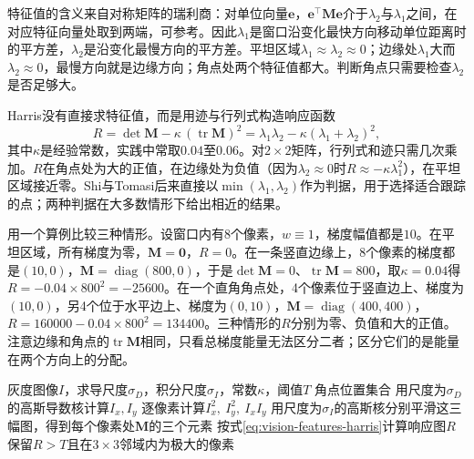 特征值的含义来自对称矩阵的瑞利商：对单位向量$\bm e$，$\bm e^{\top}\bm M\bm e$介于$\lambda_2$与$\lambda_1$之间，在对应特征向量处取到两端，可参考。因此$\lambda_1$是窗口沿变化最快方向移动单位距离时的平方差，$\lambda_2$是沿变化最慢方向的平方差。平坦区域$\lambda_1\approx\lambda_2\approx0$；边缘处$\lambda_1$大而$\lambda_2\approx0$，最慢方向就是边缘方向；角点处两个特征值都大。判断角点只需要检查$\lambda_2$是否足够大。

Harris没有直接求特征值，而是用迹与行列式构造响应函数
\begin{equation}
  R=\det\bm M-\kappa\,(\operatorname{tr}\bm M)^2=\lambda_1\lambda_2-\kappa(\lambda_1+\lambda_2)^2,
  \label{eq:vision-features-harris}
\end{equation}
其中$\kappa$是经验常数，实践中常取$0.04$至$0.06$。对$2\times2$矩阵，行列式和迹只需几次乘加。$R$在角点处为大的正值，在边缘处为负值（因为$\lambda_2\approx0$时$R\approx-\kappa\lambda_1^2$），在平坦区域接近零。Shi与Tomasi后来直接以$\min(\lambda_1,\lambda_2)$作为判据，用于选择适合跟踪的点；两种判据在大多数情形下给出相近的结果。

用一个算例比较三种情形。设窗口内有$8$个像素，$w\equiv1$，梯度幅值都是$10$。在平坦区域，所有梯度为零，$\bm M=\bm0$，$R=0$。在一条竖直边缘上，8个像素的梯度都是$(10,0)$，$\bm M=\operatorname{diag}(800,0)$，于是$\det\bm M=0$、$\operatorname{tr}\bm M=800$，取$\kappa=0.04$得$R=-0.04\times800^2=-25600$。在一个直角角点处，4个像素位于竖直边上、梯度为$(10,0)$，另4个位于水平边上、梯度为$(0,10)$，$\bm M=\operatorname{diag}(400,400)$，$R=160000-0.04\times800^2=134400$。三种情形的$R$分别为零、负值和大的正值。注意边缘和角点的$\operatorname{tr}\bm M$相同，只看总梯度能量无法区分二者；区分它们的是能量在两个方向上的分配。

\begin{algorithm}[Harris角点检测]
  \label{alg:vision-features-harris}
  \begin{algorithmic}[1]
    \Require 灰度图像$I$，求导尺度$\sigma_D$，积分尺度$\sigma_I$，常数$\kappa$，阈值$T$
    \Ensure 角点位置集合
    \State 用尺度为$\sigma_D$的高斯导数核计算$I_x,I_y$
    \State 逐像素计算$I_x^2,\ I_y^2,\ I_xI_y$
    \State 用尺度为$\sigma_I$的高斯核分别平滑这三幅图，得到每个像素处$\bm M$的三个元素
    \State 按式\eqref{eq:vision-features-harris}计算响应图$R$
    \State 保留$R>T$且在$3\times3$邻域内为极大的像素
  \end{algorithmic}
\end{algorithm}

